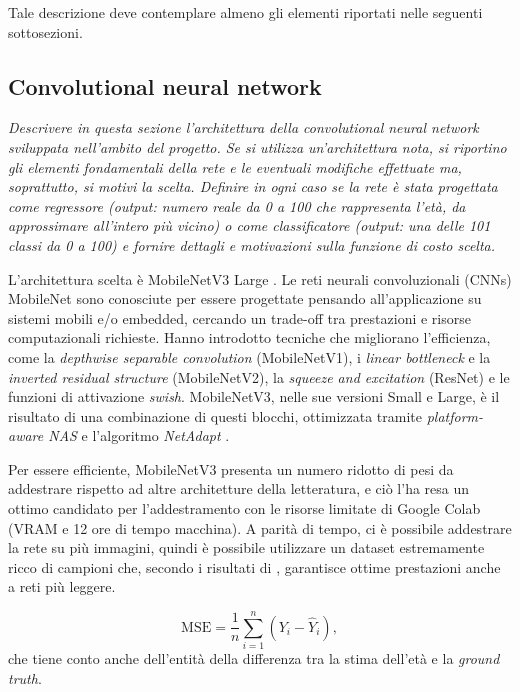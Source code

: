 Tale descrizione deve contemplare almeno gli elementi riportati nelle seguenti sottosezioni.

\subsection{Convolutional neural network} 
\emph{Descrivere in questa sezione l’architettura della convolutional neural network
sviluppata nell’ambito del progetto. Se si utilizza un’architettura nota, si riportino gli elementi fondamentali della rete e le eventuali modifiche effettuate ma, soprattutto, si motivi la scelta.
Definire in ogni caso se la rete è stata progettata come regressore (output:
numero reale da 0 a 100 che rappresenta l’età, da approssimare all’intero più
vicino) o come classificatore (output: una delle 101 classi da 0 a 100) e fornire dettagli e motivazioni sulla funzione di costo scelta.}

L'architettura scelta è MobileNetV3 Large \cite{mobilenetv3}. Le reti neurali convoluzionali (CNNs) MobileNet sono conosciute per essere progettate pensando all'applicazione su sistemi mobili e/o embedded, cercando un trade-off tra prestazioni e risorse computazionali richieste. Hanno introdotto tecniche che migliorano l'efficienza, come la \emph{depthwise separable convolution} (MobileNetV1), i \emph{linear bottleneck} e la \emph{inverted residual structure} (MobileNetV2), la \emph{squeeze and excitation} (ResNet) e le funzioni di attivazione \emph{swish}. MobileNetV3, nelle sue versioni Small e Large, è il risultato di una combinazione di questi blocchi, ottimizzata tramite \emph{platform-aware NAS} e l'algoritmo \emph{NetAdapt} \cite{mobilenetv3}. 

Per essere efficiente, MobileNetV3 presenta un numero ridotto di pesi da addestrare rispetto ad altre architetture della letteratura, e ciò l'ha resa un ottimo candidato per l'addestramento con le risorse limitate di Google Colab (VRAM e 12 ore di tempo macchina). A parità di tempo, ci è possibile addestrare la rete su più immagini, quindi è possibile utilizzare un dataset estremamente ricco di campioni che, secondo i risultati di \cite{miviaage}, garantisce ottime prestazioni anche a reti più leggere.

\begin{displaymath}
\text{MSE} = \frac{1}{n} \sum_{i=1}^{n} \left(Y_i - \hat{Y}_i\right),
\end{displaymath}
che tiene conto anche dell'entità della differenza tra la stima dell'età e la \emph{ground truth}.

